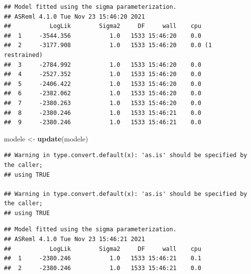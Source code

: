 \documentclass[
  12pt,
]{book}
\newenvironment{Shaded}{\begin{snugshade}}{\end{snugshade}}
\newcommand{\KeywordTok}[1]{\textcolor[rgb]{0.13,0.29,0.53}{\textbf{#1}}}
\newcommand{\NormalTok}[1]{#1}
\newcommand{\OperatorTok}[1]{\textcolor[rgb]{0.81,0.36,0.00}{\textbf{#1}}}
\newcommand{\StringTok}[1]{\textcolor[rgb]{0.31,0.60,0.02}{#1}}
\begin{document}
\begin{verbatim}
## Model fitted using the sigma parameterization.
## ASReml 4.1.0 Tue Nov 23 15:46:20 2021
##           LogLik        Sigma2     DF     wall    cpu
##  1     -3544.356           1.0   1533 15:46:20    0.0
##  2     -3177.908           1.0   1533 15:46:20    0.0 (1 restrained)
##  3     -2784.992           1.0   1533 15:46:20    0.0
##  4     -2527.352           1.0   1533 15:46:20    0.0
##  5     -2406.422           1.0   1533 15:46:20    0.0
##  6     -2382.062           1.0   1533 15:46:20    0.0
##  7     -2380.263           1.0   1533 15:46:20    0.0
##  8     -2380.246           1.0   1533 15:46:21    0.0
##  9     -2380.246           1.0   1533 15:46:21    0.0
\end{verbatim}

\begin{Shaded}
\begin{Highlighting}[]
\NormalTok{modele \textless{}{-}}\StringTok{ }\KeywordTok{update}\NormalTok{(modele)}
\end{Highlighting}
\end{Shaded}

\begin{verbatim}
## Warning in type.convert.default(x): 'as.is' should be specified by the caller;
## using TRUE

## Warning in type.convert.default(x): 'as.is' should be specified by the caller;
## using TRUE
\end{verbatim}

\begin{verbatim}
## Model fitted using the sigma parameterization.
## ASReml 4.1.0 Tue Nov 23 15:46:21 2021
##           LogLik        Sigma2     DF     wall    cpu
##  1     -2380.246           1.0   1533 15:46:21    0.1
##  2     -2380.246           1.0   1533 15:46:21    0.0
\end{verbatim}

\begin{Shaded}
\end{Shaded}
\end{document}
